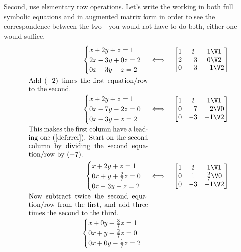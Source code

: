 \begin{example}
\begin{solution}
Second, use elementary row operations.
Let's write the working in both full symbolic equations and in augmented matrix form in order to see the correspondence between the two---you would not have to do both, either one would suffice.
\begin{eqnarray*}
\begin{cases}
x+2y+z=1\\ 2x-3y+0z=2\\ 0x-3y-z=2
\end{cases}
&\iff&%
\begin{bmatrix} 1&2&1\V1\\2&-3&0\V2\\0&-3&-1\V2 \end{bmatrix}
\\[0ex plus 1ex]
\parbox{0.5\linewidth}{Add \((-2)\) times the first equation\slash row to the second.}
\\[0ex plus 1ex]
\begin{cases}
x+2y+z=1\\ 0x-7y-2z=0\\ 0x-3y-z=2
\end{cases}
&\iff&%
\begin{bmatrix} 1&2&1\V1\\0&-7&-2\V0\\0&-3&-1\V2 \end{bmatrix}
\\[0ex plus 1ex]
\parbox{0.5\linewidth}{This makes the first column have a leading one (\cref{def:rref}).  Start on the second column by dividing the second equation\slash row by~\((-7)\).}
\\[0ex plus 1ex]
\begin{cases}
x+2y+z=1\\ 0x+y+\frac27z=0\\ 0x-3y-z=2
\end{cases}
&\iff&%
\begin{bmatrix} 1&2&1\V1\\0&1&\frac27\V0\\0&-3&-1\V2 \end{bmatrix}
\\[0ex plus 1ex]
\parbox{0.5\linewidth}{Now subtract twice the second equation\slash row from the first, and add three times the second to the third.}
\\[0ex plus 1ex]
\begin{cases}
x+0y+\frac37z=1\\ 0x+y+\frac27z=0\\ 0x+0y-\frac17z=2

\end{cases}
\end{eqnarray*}
\end{solution}
\end{example}

